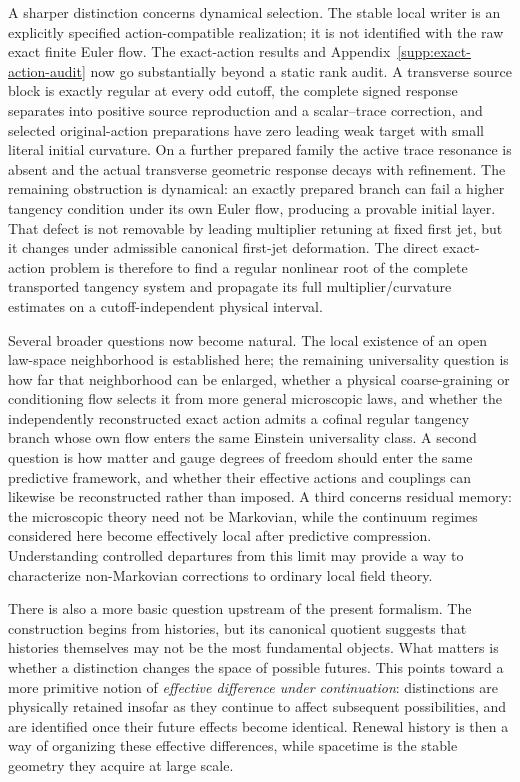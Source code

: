 \documentclass[11pt]{article}
\theoremstyle{definition}
\theoremstyle{remark}
\begin{document}
A sharper distinction concerns dynamical selection.  The stable local writer
is an explicitly specified action-compatible realization; it is not identified
with the raw exact finite Euler flow.  The exact-action results
 and
Appendix~\ref{supp:exact-action-audit} now go substantially beyond a static
rank audit.  A transverse source block is exactly regular at every odd cutoff,
the complete signed response separates into positive source reproduction and
a scalar--trace correction, and selected original-action preparations have
zero leading weak target with small literal initial curvature.  On a further
prepared family the active trace resonance is absent and the actual transverse
geometric response decays with refinement.  The remaining obstruction is
dynamical: an exactly prepared branch can fail a higher tangency condition
under its own Euler flow, producing a provable initial layer.  That defect is
not removable by leading multiplier retuning at fixed first jet, but it changes
under admissible canonical first-jet deformation.  The direct exact-action
problem is therefore to find a regular nonlinear root of the complete
transported tangency system and propagate its full multiplier/curvature
estimates on a cutoff-independent physical interval.

Several broader questions now become natural.  The local existence of an open
law-space neighborhood is established here; the remaining universality
question is how far that neighborhood can be enlarged, whether a physical
coarse-graining or conditioning flow selects it from more general microscopic
laws, and whether the independently reconstructed exact action admits a
cofinal regular tangency branch whose own flow enters the same Einstein
universality class.  A second question is how matter and gauge degrees of
freedom should enter the same predictive framework, and whether their
effective actions and couplings can likewise be reconstructed rather than
imposed.  A third concerns residual memory: the microscopic theory need not be
Markovian, while the continuum regimes considered here become effectively
local after predictive compression.  Understanding controlled departures from
this limit may provide a way to characterize non-Markovian corrections to
ordinary local field theory.

There is also a more basic question upstream of the present formalism.  The
construction begins from histories, but its canonical quotient suggests that
histories themselves may not be the most fundamental objects.  What matters is
whether a distinction changes the space of possible futures.  This points
toward a more primitive notion of \emph{effective difference under
continuation}: distinctions are physically retained insofar as they continue
to affect subsequent possibilities, and are identified once their future
effects become identical.  Renewal history is then a way of organizing these
effective differences, while spacetime is the stable geometry they acquire at
large scale.
\end{document}
